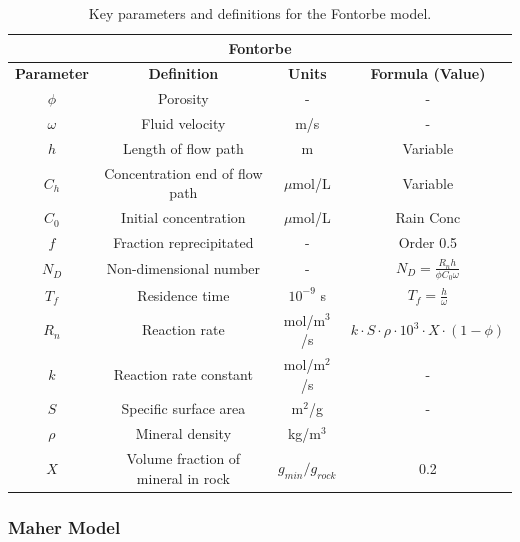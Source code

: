 \begin{table}[h]
    \centering
    \renewcommand{\arraystretch}{1.3} %
    \begin{tabular}{|c|c|c|c|}
        \hline
        \multicolumn{4}{|c|}{\textbf{Fontorbe}} \\  
        \hline
        \textbf{Parameter} & \textbf{Definition} & \textbf{Units} & \textbf{Formula (Value)} \\  
        \hline
        $\phi$ & Porosity & - & - \\
        $\omega$ & Fluid velocity & m/s & - \\
        $h$ & Length of flow path & m & Variable \\
        $C_h$ & Concentration \@ end of flow path & $\mu$mol/L & Variable \\
        $C_0$ & Initial concentration & $\mu$mol/L & Rain Conc \\
        $f$ & Fraction reprecipitated & - & Order 0.5 \\
        $N_D$ & Non-dimensional number & - & $N_D = \frac{R_n h}{\phi C_0 \omega}$ \\
        $T_f$ & Residence time & $10^{-9}$ s & $T_f = \frac{h}{\omega}$ \\
        $R_n$ & Reaction rate & mol/m$^3$/s & $k\cdot S \cdot \rho \cdot 10^3 \cdot X \cdot (1-\phi) $ \\
        $k$ & Reaction rate constant & mol/m$^2$/s & - \\
        $S$ & Specific surface area & m$^2$/g & - \\
        $\rho$ & Mineral density & kg/m$^3$ &  \\
        $X$ & Volume fraction of mineral in rock & $g_{min}/g_{rock}$ & 0.2 \\
        \hline
    \end{tabular}
    \caption{Key parameters and definitions for the Fontorbe model.}
    \label{tab:parameters1}
\end{table}


\FloatBarrier









\newpage




\subsubsection{Maher Model}


